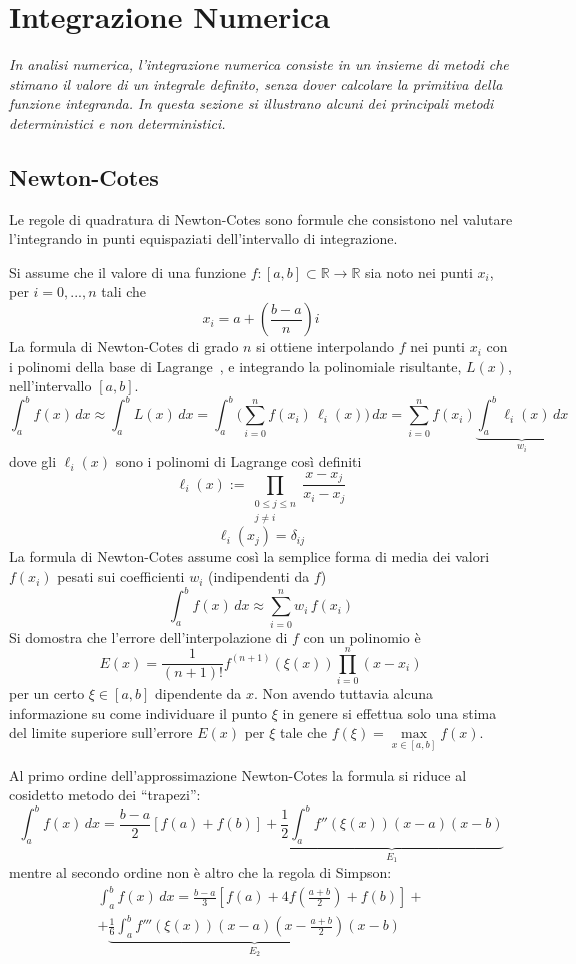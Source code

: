 \chapter{\huge Integrazione Numerica}

\textit{In analisi numerica, l'integrazione numerica consiste in un insieme di metodi che stimano il valore di un integrale definito, senza dover calcolare la primitiva della funzione integranda. In questa sezione si illustrano alcuni dei principali metodi deterministici e non deterministici.}

\section{Newton-Cotes}
Le regole di quadratura di Newton-Cotes sono formule che consistono nel valutare l'integrando in punti equispaziati dell'intervallo di integrazione.

Si assume che il valore di una funzione $f:[a,b]\subset\mathbb{R}\rightarrow\mathbb{R}$ sia noto nei punti $x_i$, per $i=0,...,n$ tali che $$x_i=a+\left(\frac{b-a}{n}\right)i$$
La formula di Newton-Cotes di grado $n$ si ottiene interpolando $f$ nei punti $x_i$ con i polinomi della base di Lagrange~\cite{uno}, e integrando la polinomiale risultante, $L(x)$, nell'intervallo $[a,b]$.
$$ \int_a^b f(x) \,dx \approx \int_a^b L(x)\,dx = \int_a^b \bigl( \sum_{i=0}^n f(x_i)\, \ell_i(x) \bigr) \, dx = \sum_{i=0}^n f(x_i) \underbrace{\int_a^b \ell_i(x)\, dx}_{w_i} $$
dove gli $\ell_i(x)$ sono i polinomi di Lagrange così definiti
$$\ell_i(x):= \prod_{\begin{smallmatrix}0\le j\le n\\ j\neq i\end{smallmatrix}} \frac{x-x_j}{x_i-x_j}$$$$\ell_i(x_j)=\delta_{ij}$$
La formula di Newton-Cotes assume così la semplice forma di media dei valori $f(x_i)$ pesati sui coefficienti $w_i$ (indipendenti da $f$)
$$\int_a^b f(x) \,dx \approx \sum_{i=0}^n w_i\, f(x_i)$$
Si domostra che l'errore dell'interpolazione di $f$ con un polinomio è
$$E(x)=\frac{1}{(n+1)!}f^{(n+1)}(\xi(x))\prod_{i=0}^n(x-x_i)$$
per un certo $\xi\in[a,b]$ dipendente da $x$. Non avendo tuttavia alcuna informazione su come individuare il punto $\xi$ in genere si effettua solo una stima del limite superiore sull'errore $E(x)$ per $\xi$ tale che $f(\xi) = \underset{x\in[a,b]}{\max}f(x)$.

Al primo ordine dell'approssimazione Newton-Cotes la formula si riduce al cosidetto metodo dei ``trapezi'':
$$\int_a^b f(x) \,dx=\frac{b-a}{2}\left[ f(a)+f(b)\right] + \underbrace{\frac{1}{2}\int_a^b f''(\xi(x))(x-a)(x-b)}_{E_1}$$
mentre al secondo ordine non è altro che la regola di Simpson:
\begin{multline*}
\int_a^b f(x) \,dx=\frac{b-a}{3}\left[f(a)+4f(\frac{a+b}{2})+f(b)\right] +\\ + \underbrace{\frac{1}{6}\int_a^b f'''(\xi(x))(x-a)(x-\frac{a+b}{2})(x-b)}_{E_2}
\end{multline*}

